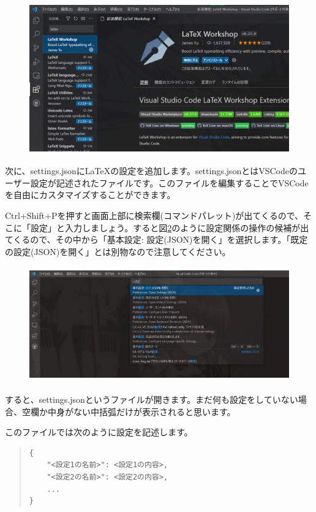 \begin{figure}[H]
    \centering
    \includegraphics[height=65mm]{img/latexworkshop.png}
    \caption{}
    \label{fig:latexworkshop}
\end{figure}

次に、settings.jsonにLaTeXの設定を追加します。settings.jsonとはVSCodeのユーザー設定が記述されたファイルです。このファイルを編集することでVSCodeを自由にカスタマイズすることができます。

Ctrl+Shift+Pを押すと画面上部に検索欄(コマンドパレット)が出てくるので、そこに「設定」と入力しましょう。すると図\ref{fig:settings_json}のように設定関係の操作の候補が出てくるので、その中から「基本設定: 設定(JSON)を開く」を選択します。「既定の設定(JSON)を開く」とは別物なので注意してください。

\begin{figure}[H]
    \centering
    \includegraphics[height=50mm]{img/settings_json.png}
    \caption{}
    \label{fig:settings_json}
\end{figure}

すると、settings.jsonというファイルが開きます。まだ何も設定をしていない場合、空欄か中身がない中括弧だけが表示されると思います。

このファイルでは次のように設定を記述します。

\begin{quote}
    \begin{verbatim}
{
    "<設定1の名前>": <設定1の内容>,
    "<設定2の名前>": <設定2の内容>,
    ...
}
\end{verbatim}
\end{quote}

